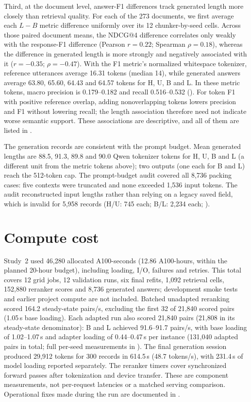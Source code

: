 Third, at the document level, answer-F1 differences track generated length more closely than retrieval quality. For each of the 273 documents, we first average each $L-B$ metric difference uniformly over its 12 chunker-by-seed cells. Across those paired document means, the NDCG@4 difference correlates only weakly with the response-F1 difference (Pearson $r=0.22$; Spearman $\rho=0.18$), whereas the difference in generated length is more strongly and negatively associated with it ($r=-0.35$; $\rho=-0.47$). With the F1 metric's normalized whitespace tokenizer, reference utterances average 16.31 tokens (median 14), while generated answers average 63.80, 65.60, 64.43 and 64.57 tokens for H, U, B and L. In these metric tokens, macro precision is 0.179--0.182 and recall 0.516--0.532 (). For token F1 with positive reference overlap, adding nonoverlapping tokens lowers precision and F1 without lowering recall; the length association therefore need not indicate worse semantic support. These associations are descriptive, and all of them are listed in .

The generation records are consistent with the prompt budget. Mean generated lengths are 88.5, 91.3, 89.8 and 90.0 Qwen tokenizer tokens for H, U, B and L (a different unit from the metric tokens above); two outputs (one each for B and L) reach the 512-token cap. The prompt-budget audit covered all 8,736 packing cases: five contexts were truncated and none exceeded 1,536 input tokens. The audit reconstructed input lengths rather than relying on a legacy saved field, which is invalid for 5,958 records (H/U: 745 each; B/L: 2,234 each; ).

\section{Compute cost}
Study~2 used 46,280 allocated A100-seconds (12.86 A100-hours, within the planned 20-hour budget), including loading, I/O, failures and retries. This total covers 12 grid jobs, 12 validation runs, six final refits, 1,092 retrieval cells, 152,880 reranker scores and 8,736 generated answers; development smoke tests and earlier project compute are not included. Batched unadapted reranking scored 164.2 steady-state pairs/s, excluding the first 32 of 21,840 scored pairs (1.05\,s base loading). Each adapted run also scored 21,840 pairs (21,808 in its steady-state denominator): B and L achieved 91.6--91.7 pairs/s, with base loading of 1.02--1.07\,s and adapter loading of 0.44--0.47\,s per instance (131,040 adapted pairs in total; full per-seed measurements in ). The final generation session produced 29,912 tokens for 300 records in 614.5\,s (48.7 tokens/s), with 231.4\,s of model loading reported separately. The reranker timers cover synchronized forward passes after tokenization and device transfer. These are component measurements, not per-request latencies or a matched serving comparison. Operational fixes made during the run are documented in .

